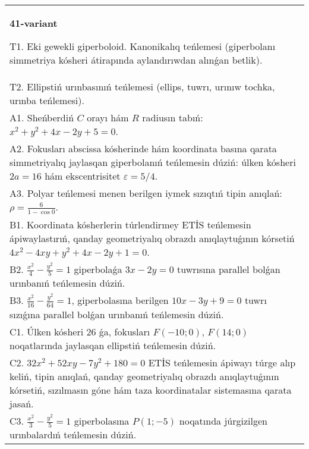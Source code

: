\documentclass{article}
\begin{document}
\begin{tabular}{m{17cm}}
\textbf{41-variant}
\newline

T1. Eki gewekli giperboloid. Kanonikalıq teńlemesi (giperbolanı simmetriya kósheri átirapında aylandırıwdan alınǵan betlik).\\

T2. Ellipstiń urınbasınıń teńlemesi (ellips, tuwrı, urınıw tochka, urınba teńlemesi).\\

A1. Sheńberdiń $C$ orayı hám $R$ radiusın tabıń: $x^2+y^2+4 x-2 y+5=0$.\\

A2. Fokusları abscissa kósherinde hám koordinata basına qarata simmetriyalıq jaylasqan giperbolanıń teńlemesin dúziń: úlken kósheri $2 a=16$ hám ekscentrisitet $\varepsilon=5/4$.\\

A3. Polyar teńlemesi menen berilgen iymek sızıqtıń tipin anıqlań: $\rho=\frac{6}{1-\cos 0}$.\\

B1. Koordinata kósherlerin túrlendirmey ETİS teńlemesin ápiwaylastırıń, qanday geometriyalıq obrazdı anıqlaytuǵının kórsetiń $4x^{2} - 4xy + y^{2} + 4x - 2y + 1 = 0$.  \\

B2. $\frac{x^{2}}{4} - \frac{y^{2}}{5} = 1$ giperbolaǵa $3x - 2y = 0$ tuwrısına parallel bolǵan urınbanıń teńlemesin dúziń.  \\

B3. $\frac{x^{2}}{16} - \frac{y^{2}}{64} = 1$, giperbolasına berilgen $10x - 3y + 9 = 0$ tuwrı sızıǵına parallel bolǵan urınbanıń teńlemesin dúziń.  \\

C1. Úlken kósheri 26 ǵa, fokusları $F( - 10;0)$, $F(14;0)$ noqatlarında jaylasqan ellipstiń teńlemesin dúziń.  \\

C2. $32x^{2} + 52xy - 7y^{2} + 180 = 0$ ETİS teńlemesin ápiwayı túrge alıp keliń, tipin anıqlań, qanday geometriyalıq obrazdı anıqlaytuǵının kórsetiń, sızılmasın góne hám taza koordinatalar sistemasına qarata jasań.  \\

C3. $\frac{x^{2}}{3} - \frac{y^{2}}{5} = 1$ giperbolasına $P(1; - 5)$ noqatında júrgizilgen urınbalardıń teńlemesin dúziń.\\

\end{tabular}
\vspace{1cm}
\end{document}
